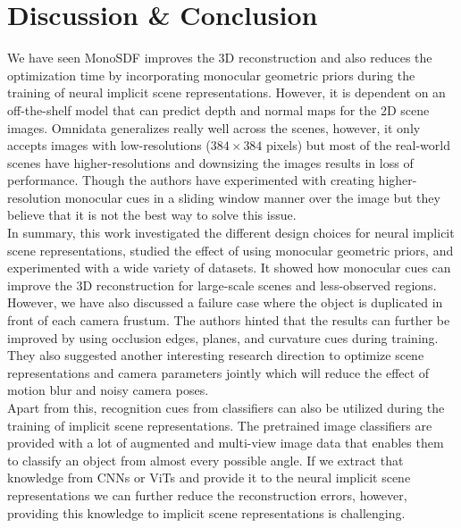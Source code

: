 \documentclass[a4paper]{paper}
\begin{document}
\section{Discussion \& Conclusion}
We have seen MonoSDF improves the 3D reconstruction and also reduces the optimization time by incorporating monocular geometric priors during the training of neural implicit scene representations. However, it is dependent on an off-the-shelf model that can predict depth and normal maps for the 2D scene images. Omnidata \cite{eftekhar2021omnidata} generalizes really well across the scenes, however, it only accepts images with low-resolutions ($384 \times 384$ pixels) but most of the real-world scenes have higher-resolutions and downsizing the images results in loss of performance. Though the authors have experimented with creating higher-resolution monocular cues in a sliding window manner over the image but they believe that it is not the best way to solve this issue. \\

In summary, this work investigated the different design choices for neural implicit scene representations, studied the effect of using monocular geometric priors, and experimented with a wide variety of datasets. It showed how monocular cues can improve the 3D reconstruction for large-scale scenes and less-observed regions. However, we have also discussed a failure case where the object is duplicated in front of each camera frustum. The authors hinted that the results can further be improved by using occlusion edges, planes, and curvature cues during training. They also suggested another interesting research direction to optimize scene representations and camera parameters jointly which will reduce the effect of motion blur and noisy camera poses. \\

Apart from this, recognition cues from classifiers can also be utilized during the training of implicit scene representations. The pretrained image classifiers are provided with a lot of augmented and multi-view image data that enables them to classify an object from almost every possible angle. If we extract that knowledge from CNNs or ViTs and provide it to the neural implicit scene representations we can further reduce the reconstruction errors, however, providing this knowledge to implicit scene representations is challenging.


\end{document}
